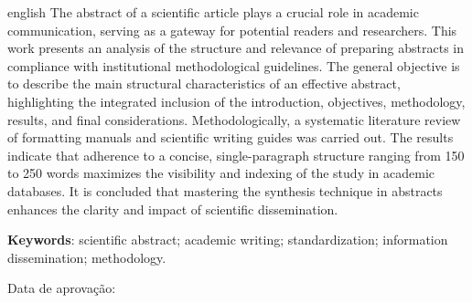\begin{resumo}[ABSTRACT]
    \begin{otherlanguage*}{english}
        \setlength{\parindent}{0pt}%
        The abstract of a scientific article plays a crucial role in academic communication, serving as a gateway for potential readers and researchers. This work presents an analysis of the structure and relevance of preparing abstracts in compliance with institutional methodological guidelines. The general objective is to describe the main structural characteristics of an effective abstract, highlighting the integrated inclusion of the introduction, objectives, methodology, results, and final considerations. Methodologically, a systematic literature review of formatting manuals and scientific writing guides was carried out. The results indicate that adherence to a concise, single-paragraph structure ranging from 150 to 250 words maximizes the visibility and indexing of the study in academic databases. It is concluded that mastering the synthesis technique in abstracts enhances the clarity and impact of scientific dissemination.
                    
        \vspace{\onelineskip}
        \noindent
        \textbf{Keywords}: scientific abstract; academic writing; standardization; information dissemination; methodology.
    \end{otherlanguage*}
\end{resumo}

\vspace{\onelineskip}
\noindent
Data de aprovação: \imprimirdataaprovacao
\vspace{1cm}

\makeatletter
\renewcommand{\textual}{%
  \OnehalfSpacing
  \pagestyle{ifpihead}
  \aliaspagestyle{chapter}{ifpihead}
  \nouppercaseheads
}
\makeatother

\textual
